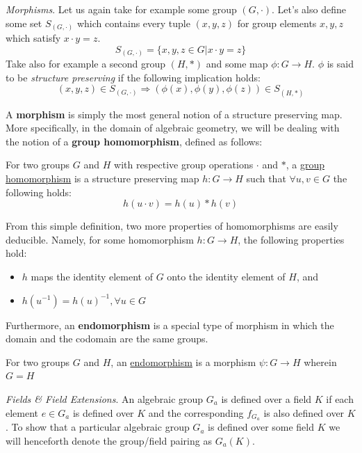 \noindent
\emph{Morphisms}. Let us again take for example some group $(G,\cdot)$. Let's also define some set $S_{(G,\cdot)}$ which contains every tuple $(x,y,z)$ for group elements $x,y,z$ which satisfy $x\cdot y = z$.
$$
S_{(G,\cdot)} = \{x,y,z \in G | x\cdot y = z\}
$$
Take also for example a second group $(H,*)$ and some map $\phi: G \rightarrow H$. $\phi$ is said to be \emph{structure preserving} if the following implication holds:
$$
(x,y,z) \in S_{(G,\cdot)} \Rightarrow (\phi(x),\phi(y),\phi(z)) \in S_{(H,*)}
$$

A \textbf{morphism} is simply the most general notion of a structure preserving map. More specifically, in the domain of algebraic geometry, we will be dealing with the notion of a \textbf{group homomorphism}, defined as follows:
\begin{tcolorbox}
\begin{definition}
\label{defn:homomorphism}
For two groups $G$ and $H$ with respective group operations $\cdot$ and $*$, a \underline{group homomorphism} is a structure preserving map $h: G \rightarrow H$ such that $\forall u, v \in G$ the following holds:
$$h(u \cdot v) = h(u) * h(v)$$
\end{definition}
\end{tcolorbox}

From this simple definition, two more properties of homomorphisms are easily deducible. Namely, for some homomorphism $h: G \rightarrow H$, the following properties hold:
\begin{itemize}
\item $h$ maps the identity element of $G$ onto the identity element of $H$, and
\item $h(u^{-1}) = h(u)^{-1}, \forall u \in G$
\end{itemize}

Furthermore, an \textbf{endomorphism} is a special type of morphism in which the domain and the codomain are the same groups.
\begin{tcolorbox}
\begin{definition}[Endomorphism]
\label{defn:endomorphism}
For two groups $G$ and $H$, an \underline{endomorphism} is a morphism $\psi: G \rightarrow H$ wherein $G = H$
\end{definition}
\end{tcolorbox}

\noindent
\emph{Fields \& Field Extensions}. An algebraic group $G_a$ is defined over a field $K$ if each element $e \in G_a$ is defined over $K$ and the corresponding $f_{G_a}$ is also defined over $K$. To show that a particular algebraic group $G_a$ is defined over some field $K$ we will henceforth denote the group/field pairing as $G_a(K)$.\\

